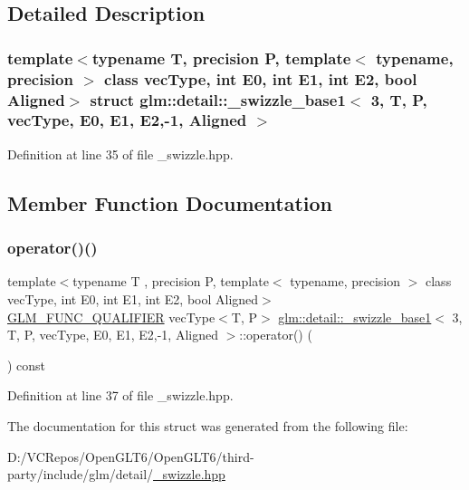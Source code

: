 \subsection{Detailed Description}
\subsubsection*{template$<$typename T, precision P, template$<$ typename, precision $>$ class vec\+Type, int E0, int E1, int E2, bool Aligned$>$\newline
struct glm\+::detail\+::\+\_\+swizzle\+\_\+base1$<$ 3, T, P, vec\+Type, E0, E1, E2,-\/1, Aligned $>$}



Definition at line 35 of file \+\_\+swizzle.\+hpp.



\subsection{Member Function Documentation}
\mbox{\label{structglm_1_1detail_1_1__swizzle__base1_3_013_00_01_t_00_01_p_00_01vec_type_00_01_e0_00_01_e1_00_01_e2_00-1_00_01_aligned_01_4_a09485ed63b638b9887bd49ba3220ab7b}} 
\subsubsection{\texorpdfstring{operator()()}{operator()()}}
{\footnotesize\ttfamily template$<$typename T , precision P, template$<$ typename, precision $>$ class vec\+Type, int E0, int E1, int E2, bool Aligned$>$ \\
\mbox{\hyperlink{setup_8hpp_a33fdea6f91c5f834105f7415e2a64407}{G\+L\+M\+\_\+\+F\+U\+N\+C\+\_\+\+Q\+U\+A\+L\+I\+F\+I\+ER}} vec\+Type$<$T, P$>$ \mbox{\hyperlink{structglm_1_1detail_1_1__swizzle__base1}{glm\+::detail\+::\+\_\+swizzle\+\_\+base1}}$<$ 3, T, P, vec\+Type, E0, E1, E2,-\/1, Aligned $>$\+::operator() (\begin{DoxyParamCaption}{ }\end{DoxyParamCaption}) const\hspace{0.3cm}{\ttfamily [inline]}}



Definition at line 37 of file \+\_\+swizzle.\+hpp.



The documentation for this struct was generated from the following file\+:\begin{DoxyCompactItemize}
\item 
D\+:/\+V\+C\+Repos/\+Open\+G\+L\+T6/\+Open\+G\+L\+T6/third-\/party/include/glm/detail/\mbox{\hyperlink{__swizzle_8hpp}{\+\_\+swizzle.\+hpp}}\end{DoxyCompactItemize}
